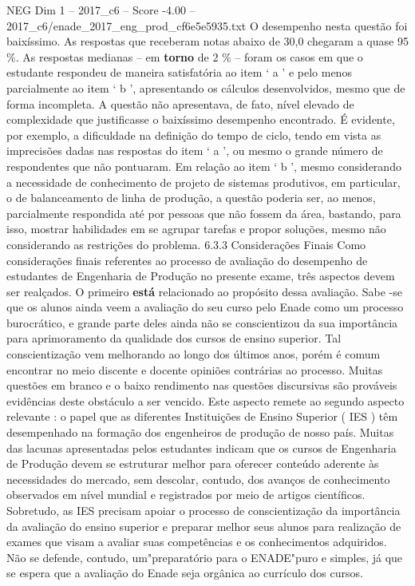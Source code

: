 \begin{textsample}{NEG Dim 1 – 2017\_c6 – Score -4.00 – 2017\_c6/enade\_2017\_eng\_prod\_cf6e5e5935.txt}
O desempenho nesta questão foi baixíssimo.
As respostas que receberam notas abaixo de 30,0 chegaram a quase 95 \%.
As respostas medianas – em \textbf{torno} de 2 \% – foram os casos em que o estudante respondeu de maneira satisfatória ao item ‘ a ’ e pelo menos parcialmente ao item ‘ b ’, apresentando os cálculos desenvolvidos, mesmo que de forma incompleta.
A questão não apresentava, de fato, nível elevado de complexidade que justificasse o baixíssimo desempenho encontrado.
É evidente, por exemplo, a dificuldade na definição do tempo de ciclo, tendo em vista as imprecisões dadas nas respostas do item ‘ a ’, ou mesmo o grande número de respondentes que não pontuaram.
Em relação ao item ‘ b ’, mesmo considerando a necessidade de conhecimento de projeto de sistemas produtivos, em particular, o de balanceamento de linha de produção, a questão poderia ser, ao menos, parcialmente respondida até por pessoas que não fossem da área, bastando, para isso, mostrar habilidades em se agrupar tarefas e propor soluções, mesmo não considerando as restrições do problema. 6.3.3 Considerações Finais Como considerações finais referentes ao processo de avaliação do desempenho de estudantes de Engenharia de Produção no presente exame, três aspectos devem ser realçados.
O primeiro \textbf{está} relacionado ao propósito dessa avaliação.
Sabe -se que os alunos ainda veem a avaliação do seu curso pelo Enade como um processo burocrático, e grande parte deles ainda não se conscientizou da sua importância para aprimoramento da qualidade dos cursos de ensino superior.
Tal conscientização vem melhorando ao longo dos últimos anos, porém é comum encontrar no meio discente e docente opiniões contrárias ao processo.
Muitas questões em branco e o baixo rendimento nas questões discursivas são prováveis evidências deste obstáculo a ser vencido.
Este aspecto remete ao segundo aspecto relevante : o papel que as diferentes Instituições de Ensino Superior ( IES ) têm desempenhado na formação dos engenheiros de produção de nosso país.
Muitas das lacunas apresentadas pelos estudantes indicam que os cursos de Engenharia de Produção devem se estruturar melhor para oferecer conteúdo aderente às necessidades do mercado, sem descolar, contudo, dos avanços de conhecimento observados em nível mundial e registrados por meio de artigos científicos.
Sobretudo, as IES precisam apoiar o processo de conscientização da importância da avaliação do ensino superior e preparar melhor seus alunos para realização de exames que visam a avaliar suas competências e os conhecimentos adquiridos.
Não se defende, contudo, um"preparatório para o ENADE"puro e simples, já que se espera que a avaliação do Enade seja orgânica ao currículo dos cursos.

\end{textsample}
